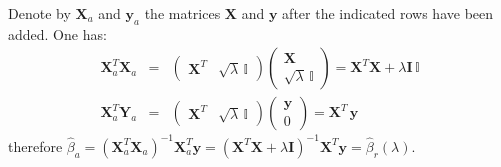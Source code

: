 


Denote by $\mathbf{X}_a$ and $\mathbf{y}_a$ the matrices $\mathbf{X}$ and $\mathbf{y}$ after the indicated
rows have been added. One has:
\begin{eqnarray*}
    \mathbf{X}_a^T \mathbf{X}_a & = & \left( \begin{array}{cc}  \mathbf{X}^T  & \sqrt{\lambda}\, \mathbb{I}  \end{array}\right) \left( \begin{array}{c} \mathbf{X} \\ \sqrt{\lambda}\, \mathbb{I} \end{array} \right) = \mathbf{X}^T \mathbf{X} + \lambda \mathbf{I}\, \mathbb{I} \\
    \mathbf{X}_a^T \mathbf{Y}_a & = & \left( \begin{array}{cc}  \mathbf{X}^T  & \sqrt{\lambda}\, \mathbb{I}  \end{array}\right) \left( \begin{array}{c} \mathbf{y} \\ 0 \end{array} \right) = \mathbf{X}^T \, \mathbf{y}
\end{eqnarray*}
therefore $\hat{\beta}_a = \left( \mathbf{X}_a^T \mathbf{X}_a \right)^{-1} \mathbf{X}_a^T \mathbf{y} =  \left( \mathbf{X}^T \mathbf{X} + \lambda \mathbf{I} \right)^{-1} \mathbf{X}^T \mathbf{y} = \hat{\beta}_{r}(\lambda)$.